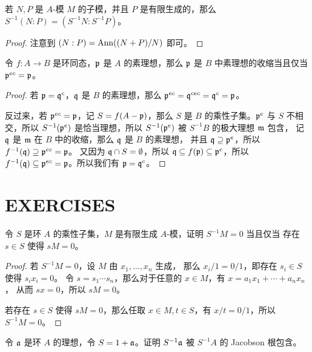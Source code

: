 \begin{corollary}
  若 $N,P$ 是 $A$-模 $M$ 的子模，并且 $P$ 是有限生成的，那么
  $S^{-1}(N:P)=(S^{-1}N:S^{-1}P)$。
\end{corollary}
\begin{proof}
  注意到 $(N:P)=\operatorname{Ann}((N+P)/N)$ 即可。
\end{proof}

\begin{proposition}\label{prop:condition of contraction}
  令 $f:A\to B$ 是环同态，$\mathfrak{p}$ 是 $A$ 的素理想，那么 $\mathfrak{p}$ 是 $B$
  中素理想的收缩当且仅当 $\mathfrak{p}^{ec}=\mathfrak{p}$。
\end{proposition}
\begin{proof}
  若 $\mathfrak{p}=\mathfrak{q}^c$，$\mathfrak{q}$ 是 $B$ 的素理想，那么 
  $\mathfrak{p}^{ec}=\mathfrak{q}^{cec}=\mathfrak{q}^c=\mathfrak{p}$。

  反过来，若 $\mathfrak{p}^{ec}=\mathfrak{p}$，记 $S=f(A-\mathfrak{p})$，那么 $S$
  是 $B$ 的乘性子集。$\mathfrak{p}^e$ 与 $S$ 不相交，所以 $S^{-1}(\mathfrak{p}^e)$
  是恰当理想，所以 $S^{-1}(\mathfrak{p}^e)$ 被 $S^{-1}B$ 的极大理想 $\mathfrak{m}$ 包含，
  记 $\mathfrak{q}$ 是 $\mathfrak{m}$ 在 $B$ 中的收缩，那么 $\mathfrak{q}$ 是 $B$ 的素理想，
  并且 $\mathfrak{q}\supseteq \mathfrak{p}^e$，所以 $f^{-1}(\mathfrak{q})\supseteq \mathfrak{p}^{ec}=\mathfrak{p}$。
  又因为 $\mathfrak{q}\cap S=\emptyset$，所以 $\mathfrak{q}\subseteq f(\mathfrak{p})\subseteq\mathfrak{p}^e$，所以
  $f^{-1}(\mathfrak{q})\subseteq \mathfrak{p}^{ec}=\mathfrak{p}$。所以我们有
  $\mathfrak{p}=\mathfrak{q}^c$。
\end{proof}

\section{EXERCISES}

\begin{problem}
  令 $S$ 是环 $A$ 的乘性子集，$M$ 是有限生成 $A$-模，证明 $S^{-1}M=0$ 当且仅当
  存在 $s\in S$ 使得 $sM=0$。
\end{problem}
\begin{proof}
  若 $S^{-1}M=0$，设 $M$ 由 $x_1,\dots,x_n$ 生成，
  那么 $x_i/1=0/1$，即存在 $s_i\in S$ 使得 $s_ix_i=0$。
  令 $s=s_1\cdots s_n$，那么对于任意的 $x\in M$，有 $x=a_1x_1+\cdots+a_nx_n$，
  从而 $sx=0$，所以 $sM=0$。

  若存在 $s\in S$ 使得 $sM=0$，那么任取 $x\in M,t\in S$，有 $x/t=0/1$，所以 $S^{-1}M=0$。
\end{proof}

\begin{problem}
  令 $\mathfrak{a}$ 是环 $A$ 的理想，令 $S=1+\mathfrak{a}$。证明 $S^{-1}\mathfrak{a}$ 被
  $S^{-1}A$ 的 Jacobson 根包含。
\end{problem}


